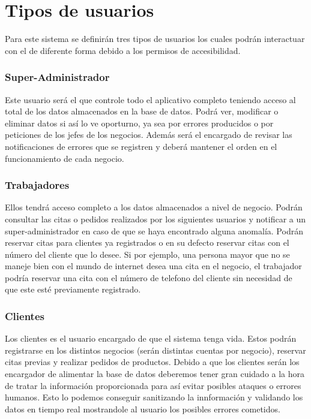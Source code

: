 \section{Tipos de usuarios}

Para este sistema se definirán tres tipos de usuarios los cuales podrán interactuar con el de diferente forma debido a los permisos de accesibilidad.

\subsubsection{Super-Administrador}

Este usuario será el que controle todo el aplicativo completo teniendo acceso al total de los datos almacenados en la base de datos. Podrá ver, modificar o eliminar datos si así lo ve oporturno, ya sea por errores producidos o por peticiones de los jefes de los negocios. Además será el encargado de revisar las notificaciones de errores que se registren y deberá mantener el orden en el funcionamiento de cada negocio.

\subsubsection{Trabajadores}

Ellos tendrá acceso completo a los datos almacenados a nivel de negocio. Podrán consultar las citas o pedidos realizados por los siguientes usuarios y notificar a un super-administrador en caso de que se haya encontrado alguna anomalía. Podrán reservar citas para clientes ya registrados o en su defecto reservar citas con el número del cliente que lo desee. Si por ejemplo, una persona mayor que no se maneje bien con el mundo de internet desea una cita en el negocio, el trabajador podría reservar una cita con el número de telefono del cliente sin necesidad de que este esté previamente registrado.

\subsubsection{Clientes}

Los clientes es el usuario encargado de que el sistema tenga vida. Estos podrán registrarse en los distintos negocios (serán distintas cuentas por negocio), reservar citas previas y realizar pedidos de productos. Debido a que los clientes serán los encargador de alimentar la base de datos deberemos tener gran cuidado a la hora de tratar la información proporcionada para así evitar posibles ataques o errores humanos. Esto lo podemos conseguir sanitizando la innformación y validando los datos en tiempo real mostrandole al usuario los posibles errores cometidos.


